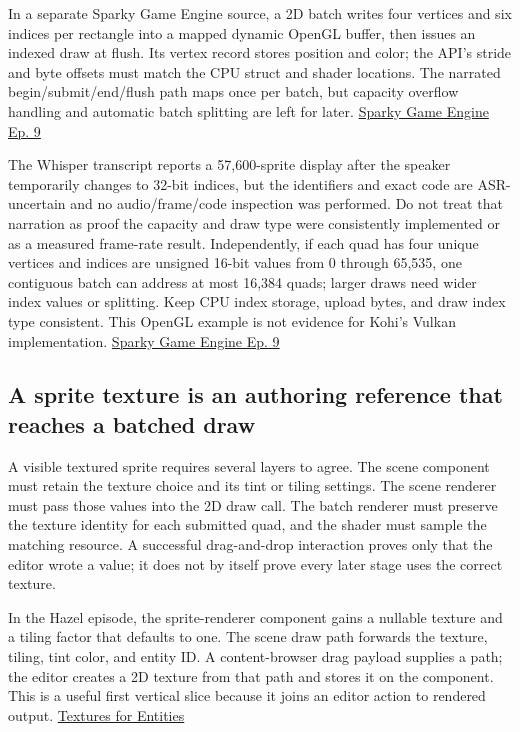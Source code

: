 \hypertarget{06-engine-ii-ch026-keep-the-opengl-asr-example-separate-from-the-kohi-vulkan-renderer}{}

In a separate Sparky Game Engine source, a 2D batch writes four vertices and six indices per rectangle into a mapped dynamic OpenGL buffer, then issues an indexed draw at flush. Its vertex record stores position and color; the API's stride and byte offsets must match the CPU struct and shader locations. The narrated begin/submit/end/flush path maps once per batch, but capacity overflow handling and automatic batch splitting are left for later. \href{https://www.youtube.com/watch?v=ImtWD_9OAeY}{Sparky Game Engine Ep. 9}

The Whisper transcript reports a 57,600-sprite display after the speaker temporarily changes to 32-bit indices, but the identifiers and exact code are ASR-uncertain and no audio/frame/code inspection was performed. Do not treat that narration as proof the capacity and draw type were consistently implemented or as a measured frame-rate result. Independently, if each quad has four unique vertices and indices are unsigned 16-bit values from 0 through 65,535, one contiguous batch can address at most 16,384 quads; larger draws need wider index values or splitting. Keep CPU index storage, upload bytes, and draw index type consistent. This OpenGL example is not evidence for Kohi's Vulkan implementation. \href{https://www.youtube.com/watch?v=ImtWD_9OAeY}{Sparky Game Engine Ep. 9}

\subsection{A sprite texture is an authoring reference that reaches a batched draw}\label{06-engine-ii-ch026-a-sprite-texture-is-an-authoring-reference-that-reaches-a-batched-draw}

\hypertarget{06-engine-ii-ch026-a-sprite-texture-is-an-authoring-reference-that-reaches-a-batched-draw}{}

A visible textured sprite requires several layers to agree. The scene component must retain the texture choice and its tint or tiling settings. The scene renderer must pass those values into the 2D draw call. The batch renderer must preserve the texture identity for each submitted quad, and the shader must sample the matching resource. A successful drag-and-drop interaction proves only that the editor wrote a value; it does not by itself prove every later stage uses the correct texture.

In the Hazel episode, the sprite-renderer component gains a nullable texture and a tiling factor that defaults to one. The scene draw path forwards the texture, tiling, tint color, and entity ID. A content-browser drag payload supplies a path; the editor creates a 2D texture from that path and stores it on the component. This is a useful first vertical slice because it joins an editor action to rendered output. \href{https://www.youtube.com/watch?v=woSa-ZMJl-Q}{Textures for Entities}

